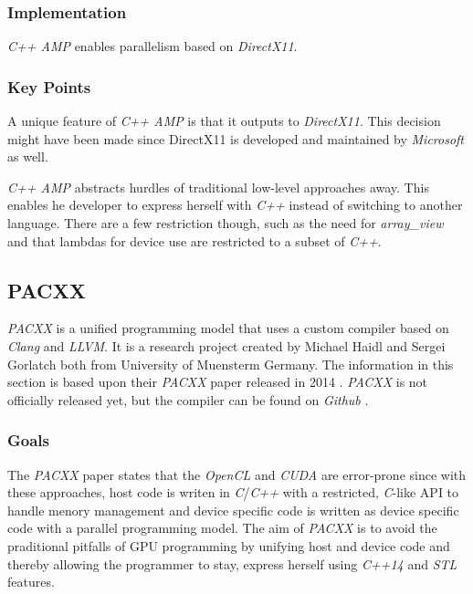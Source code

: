 \subsubsection{Implementation}
\textit{C++ AMP} enables parallelism based on \textit{DirectX11}.

\subsubsection{Key Points}
A unique feature of \textit{C++ AMP} is that it outputs to \textit{DirectX11}. This decision might have been made since DirectX11 is developed and maintained by \textit{Microsoft} as well.

\textit{C++ AMP} abstracts hurdles of traditional low-level approaches away. This enables he developer to express herself with \textit{C++} instead of switching to another language. There are a few restriction though, such as the need for \textit{array\_view} and that lambdas for device use are restricted to a subset of \textit{C++}.


\subsection{PACXX}
\textit{PACXX} is a unified programming model that uses a custom compiler based on \textit{Clang} and \textit{LLVM}. It is a research project created by Michael Haidl and Sergei Gorlatch both from University of Muensterm Germany. The information in this section is based upon their \textit{PACXX} paper released in 2014 \cite{pacxxPaper}. \textit{PACXX} is not officially released yet, but the compiler can be found on \textit{Github} \cite{pacxxGithub}.

\subsubsection{Goals}
The \textit{PACXX} paper states that the \textit{OpenCL} and \textit{CUDA} are error-prone since with these approaches, host code is writen in \textit{C}/\textit{C++} with a restricted, \textit{C}-like API to handle menory management and device specific code is written as device specific code with a parallel programming model. The aim of \textit{PACXX} is to avoid the praditional pitfalls of GPU programming by unifying host and device code and thereby allowing the programmer to stay, express herself using \textit{C++14} and \textit{STL} features.

